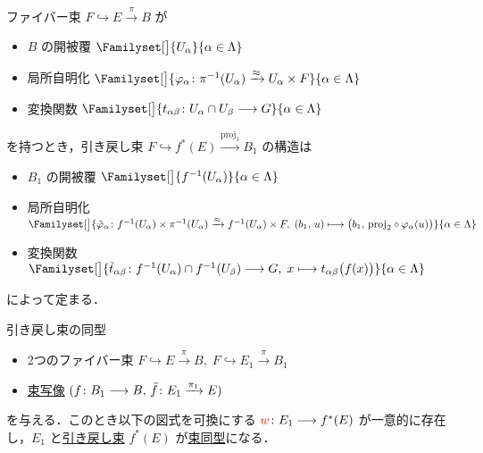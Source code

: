 \documentclass[TQFT_main]{subfiles}
\begin{document}
ファイバー束 $F \hookrightarrow E \xrightarrow{\pi} B$ が
\begin{itemize}
    \item $B$ の開被覆 $\Familyset[\big]{U_\alpha}{\alpha \in \Lambda}$
    \item 局所自明化 $\Familyset[\big]{\varphi_\alpha \colon \pi^{-1}(U_\alpha) \xrightarrow{\approx} U_\alpha \times F}{\alpha \in \Lambda}$
    \item 変換関数 $\Familyset[\big]{t_{\alpha \beta} \colon U_\alpha \cap U_\beta \lto G}{\alpha \in \Lambda}$
\end{itemize}
を持つとき，引き戻し束 $F \hookrightarrow f^*(E) \xrightarrow{\mathrm{proj_1}} B_1$ の構造は
\begin{itemize}
    \item $B_1$ の開被覆 $\Familyset[\big]{f^{-1}(U_\alpha)}{\alpha \in \Lambda}$
    \item 局所自明化 $\Familyset[\big]{\tilde{\varphi}_\alpha \colon f^{-1}(U_\alpha) \times \pi^{-1}(U_\alpha) \xrightarrow{\approx} f^{-1}(U_\alpha) \times F,\; (b_1,\, u) \lmto \bigl(b_1,\, \mathrm{proj}_2 \circ \varphi_\alpha (u)\bigr)}{\alpha \in \Lambda}$
    \item 変換関数 $\Familyset[\big]{\tilde{t}_{\alpha \beta} \colon f^{-1}(U_\alpha) \cap f^{-1}(U_\beta) \lto G,\; x \lmto t_{\alpha\beta}\bigl(f(x)\bigr)}{\alpha \in \Lambda}$
\end{itemize}
によって定まる．

\begin{myprop}[label=prop:pullback-isom]{引き戻し束の同型}
    \begin{itemize}
        \item 2つのファイバー束 $F \hookrightarrow E \xrightarrow{\pi} B,\; F \hookrightarrow E_1 \xrightarrow{\pi} B_1$
        \item \hyperref[def.bundlemap]{束写像} $(f \colon B_1 \longrightarrow B,\, \tilde{f} \colon E_1 \xrightarrow{\pi_1} E)$
    \end{itemize}
    を与える．このとき以下の図式を可換にする $\textcolor{red}{w} \colon E_1 \longrightarrow f^*(E)$ が一意的に存在し，$E_1$ と\hyperref[def:pullback-bundle]{引き戻し束} $f^*(E)$ が\hyperref[def.bundlemap]{束同型}になる．
    \begin{center}
    \end{center}
\end{myprop}
\end{document}
